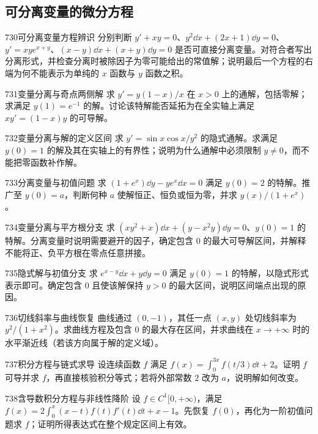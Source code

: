 \subsection{可分离变量的微分方程}
\begin{exercise}{730}{可分离变量方程辨识}
分别判断 $y'+xy=0$、$y^2\dd x+(2x+1)\dd y=0$、$y'=xye^{x+y}$、$(x-y)\dd x+(x+y)\dd y=0$ 是否可直接分离变量。对符合者写出分离形式，并检查分离时被除因子为零可能给出的常值解；说明最后一个方程的右端为何不能表示为单纯的 $x$ 函数与 $y$ 函数之积。
\end{exercise}
\begin{exercise}{731}{变量分离与奇点两侧解}
求 $y'=y(1-x)/x$ 在 $x>0$ 上的通解，包括零解；求满足 $y(1)=e^{-1}$ 的解。讨论该特解能否延拓为在全实轴上满足 $xy'=(1-x)y$ 的可导解。
\end{exercise}
\begin{exercise}{732}{变量分离与解的定义区间}
求 $y'=\sin x\cos x/y^2$ 的隐式通解。求满足 $y(0)=1$ 的解及其在实轴上的有界性；说明为什么通解中必须限制 $y\ne0$，而不能把零函数补作解。
\end{exercise}
\begin{exercise}{733}{分离变量与初值问题}
求 $(1+e^x)\dd y-ye^x\dd x=0$ 满足 $y(0)=2$ 的特解。推广至 $y(0)=a$，判断何种 $a$ 使解恒正、恒负或恒为零，并求 $y(x)/(1+e^x)$。
\end{exercise}
\begin{exercise}{734}{变量分离与平方根分支}
求 $(xy^2+x)\dd x+(y-x^2y)\dd y=0$、$y(0)=1$ 的特解。分离变量时说明需要避开的因子，确定包含 $0$ 的最大可导解区间，并解释不能将正、负平方根在零点任意拼接。
\end{exercise}
\begin{exercise}{735}{隐式解与初值分支}
求 $e^{x-y}\dd x+y\dd y=0$ 满足 $y(0)=1$ 的特解，以隐式形式表示即可。确定包含 $0$ 且使该解保持 $y>0$ 的最大区间，说明区间端点出现的原因。
\end{exercise}
\begin{exercise}{736}{切线斜率与曲线恢复}
曲线通过 $(0,-1)$，其任一点 $(x,y)$ 处切线斜率为 $y^2/(1+x^2)$。求曲线方程及包含 $0$ 的最大存在区间，并求曲线在 $x\to+\infty$ 时的水平渐近线（若该方向属于解的定义域）。
\end{exercise}
\begin{exercise}{737}{积分方程与链式求导}
设连续函数 $f$ 满足 $f(x)=\int_0^{3x}f(t/3)\dd t+2$。证明 $f$ 可导并求 $f$，再直接核验积分等式；若将外部常数 $2$ 改为 $a$，说明解如何改变。
\end{exercise}
\begin{exercise}{738}{含导数积分方程与非线性降阶}
设 $f\in C^1[0,+\infty)$，满足 $f(x)=2\int_0^x(x-t)f(t)f'(t)\dd t+x-1$。先恢复 $f(0)$，再化为一阶初值问题求 $f$；证明所得表达式在整个规定区间上有效。
\end{exercise}
